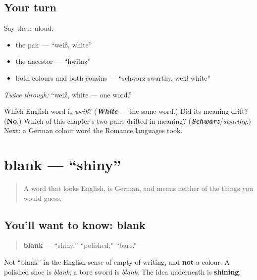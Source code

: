 \subsection*{Your turn}
Say these aloud:

\begin{itemize}
\raggedright
  \item the pair — \textquotedblleft{}weiß, white\textquotedblright{}
  \item the ancestor — \textquotedblleft{}hwītaz\textquotedblright{}
  \item both colours and both cousins — \textquotedblleft{}schwarz swarthy, weiß white\textquotedblright{}
\end{itemize}

\emph{Twice through:} \textquotedblleft{}weiß, white — one word.\textquotedblright{}

\begin{tcolorbox}[breakable,colback=teal!4,colframe=teal!35!black,title={Before you move on}]
Which English word is \emph{weiß}? (\emph{\textbf{White}} — the same word.) Did its meaning drift? (\textbf{No}.) Which of this chapter's two pairs drifted in meaning? (\emph{\textbf{Schwarz}}/\emph{swarthy}.) Next: a German colour word the Romance languages took.
\end{tcolorbox}
\section[blank]{blank — \textquotedblleft{}shiny\textquotedblright{}}

\label{lesson:GE-C13-blank}



\begin{quote}
A word that looks English, is German, and means neither of the things you would guess.
\end{quote}

\subsection*{You'll want to know: blank}
\begin{quote}
\textbf{blank} — \textquotedblleft{}shiny,\textquotedblright{} \textquotedblleft{}polished,\textquotedblright{} \textquotedblleft{}bare.\textquotedblright{}
\end{quote}

Not \textquotedblleft{}blank\textquotedblright{} in the English sense of empty-of-writing, and \textbf{not} a colour. A polished shoe is \emph{blank}; a bare sword is \emph{blank}. The idea underneath is \textbf{shining}.

